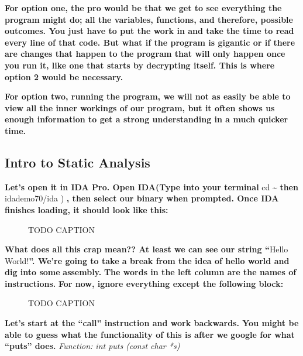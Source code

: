 \documentclass[letterpaper]{article}
\newcommand{\sitfig}[3]{
\begin{figure}[H]
\centering
\makebox[\textwidth][c]{
#2
}
\caption{#3}
\label{#1}
\end{figure}
}
\newcommand{\sitgfx}[4][scale=1.0]{
\sitfig{#3}{\texttt{[image: \#2]}}{#4}
}
\begin{document}
\textbf{For option one, the pro would be that we get to see everything the program might do; all the variables,
functions, and therefore, possible outcomes. You just have to put the work in and take the time to read every line of
that code. But what if the program is gigantic or if there are changes that happen to the program that will only happen
once you run it, like one that starts by decrypting itself. This is where option 2 would be necessary. }

{\centering
\textbf{\newline
For option two, running the program, we will not as easily be able to view all the inner workings of our program, but it
often shows us enough information to get a strong understanding in a much quicker time. \newline
}}

\subsection{Intro to Static Analysis}

\textbf{Let's open it in IDA Pro. Open IDA(Type into your terminal }cd \~{} \textbf{then }idademo70/ida )\textbf{ , then
select our binary when prompted. \newline
Once IDA finishes loading, it should look like this: }

{\centering   
\sitgfx[width=5.3957in,height=5.052in]{FINALWORKINGDOCFORMERLYPRECURSOR-img009.png}{fig:unk}{TODO CAPTION}
 \par}
\textbf{What does all this crap mean?? At least we can see our string ``}Hello World!\textbf{{}''. \newline
We're going to take a break from the idea of hello world and dig into some
}\textbf{\textcolor[rgb]{0.07450981,0.30980393,0.36078432}{assembly.}}\textbf{ The words in the left column are the
names of }\textbf{\textcolor[rgb]{0.21960784,0.4627451,0.11372549}{instructions.}}\textbf{ For now, ignore everything
except the following block:}

{\centering
\textbf{\newline
\newline
 }  
\sitgfx[width=4.8126in,height=1.0209in]{FINALWORKINGDOCFORMERLYPRECURSOR-img010.png}{fig:unk}{TODO CAPTION}
 
\par}

\textbf{Let's start at the ``call'' instruction and work backwards. You might be able to guess what the functionality of
this is after we google for what ``puts'' does.\newline
\newline
}\textit{Function: int puts (const char *s)}
\end{document}
